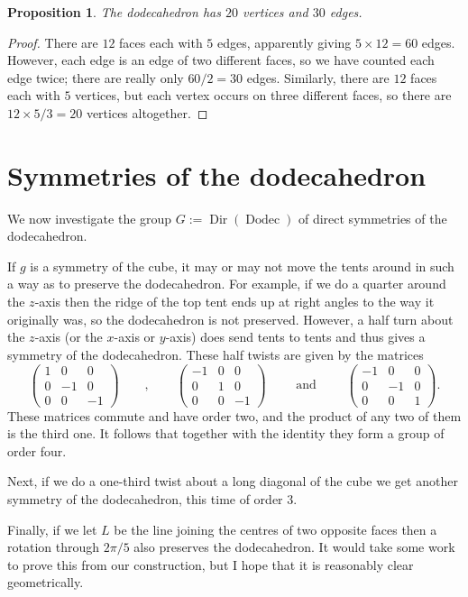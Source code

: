 \documentclass{amsart}
\DeclareMathOperator{\Dodec}    {Dodec}
\DeclareMathOperator{\Dir}      {Dir}
\newcommand{\bsm}       {\left(\begin{smallmatrix}}
\newcommand{\esm}       {\end{smallmatrix}\right)}
\renewcommand{\:}{\colon}
\newtheorem{proposition}[theorem]{Proposition}
\theoremstyle{definition}
\begin{document}
\begin{proposition}
 The dodecahedron has $20$ vertices and $30$ edges.
\end{proposition}
\begin{proof}
 There are $12$ faces each with $5$ edges, apparently giving
 $5\times 12=60$ edges.  However, each edge is an edge of two
 different faces, so we have counted each edge twice; there are really
 only $60/2=30$ edges.  Similarly, there are $12$ faces each with $5$
 vertices, but each vertex occurs on three different faces, so there
 are $12\times 5/3=20$ vertices altogether.
\end{proof}

\section{Symmetries of the dodecahedron}

We now investigate the group $G:=\Dir(\Dodec)$ of direct symmetries of
the dodecahedron.

If $g$ is a symmetry of the cube, it may or may not move the tents
around in such a way as to preserve the dodecahedron.  For example, if
we do a quarter around the $z$-axis then the ridge of the top tent
ends up at right angles to the way it originally was, so the
dodecahedron is not preserved.  However, a half turn about the
$z$-axis (or the $x$-axis or $y$-axis) does send tents to tents and
thus gives a symmetry of the dodecahedron.  These half twists are
given by the matrices
\[ \bsm 1 & 0 & 0 \\ 0 & -1 & 0 \\ 0 & 0 & -1 \esm
   \qquad,\qquad
   \bsm -1 & 0 & 0 \\ 0 & 1 & 0 \\ 0 & 0 & -1 \esm
   \qquad \text{ and } \qquad
   \bsm -1 & 0 & 0 \\ 0 &-1 & 0 \\ 0 & 0 &  1 \esm.
\]
These matrices commute and have order two, and the product of any two
of them is the third one.  It follows that together with the identity
they form a group of order four.

Next, if we do a one-third twist about a long diagonal of the cube we
get another symmetry of the dodecahedron, this time of order $3$.

Finally, if we let $L$ be the line joining the centres of two opposite
faces then a rotation through $2\pi/5$ also preserves the
dodecahedron.  It would take some work to prove this from our
construction, but I hope that it is reasonably clear geometrically.
\end{document}
